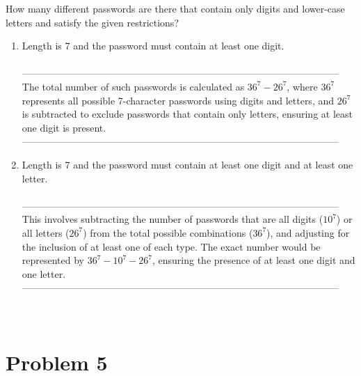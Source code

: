 \documentclass{amsart}
\theoremstyle{definition}
\theoremstyle{Exercise}
\theoremstyle{remark}
\theoremstyle{rule}
\numberwithin{equation}{section}
\begin{document}
How many different passwords are there that contain only digits and lower-case letters and satisfy the given restrictions?\\
      \begin{enumerate}[label=(\roman*), start=3]
    \item Length is 7 and the password must contain at least one digit.\\\\
--------------------------------------------------------------------------------------------------\\
The total number of such passwords is calculated as \(36^7 - 26^7\), where \(36^7\) represents all possible 7-character passwords using digits and letters, and \(26^7\) is subtracted to exclude passwords that contain only letters, ensuring at least one digit is present.\\
--------------------------------------------------------------------------------------------------\\
     \item Length is 7 and the password must contain at least one digit and at least one letter.\\\\
--------------------------------------------------------------------------------------------------\\
This involves subtracting the number of passwords that are all digits (\(10^7\)) or all letters (\(26^7\)) from the total possible combinations (\(36^7\)), and adjusting for the inclusion of at least one of each type. The exact number would be represented by \(36^7 - 10^7 - 26^7\), ensuring the presence of at least one digit and one letter.\\
--------------------------------------------------------------------------------------------------\\
\\\\
    \end{enumerate}
 
 \newpage

\section*{Problem 5}
\end{document}
